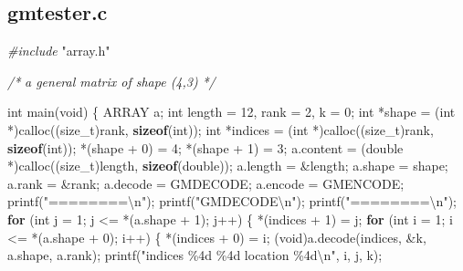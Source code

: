 \documentclass[
  12pt,
]{article}
\newenvironment{Shaded}{\begin{snugshade}}{\end{snugshade}}
\newcommand{\CommentTok}[1]{\textcolor[rgb]{0.56,0.35,0.01}{\textit{#1}}}
\newcommand{\ControlFlowTok}[1]{\textcolor[rgb]{0.13,0.29,0.53}{\textbf{#1}}}
\newcommand{\DataTypeTok}[1]{\textcolor[rgb]{0.13,0.29,0.53}{#1}}
\newcommand{\DecValTok}[1]{\textcolor[rgb]{0.00,0.00,0.81}{#1}}
\newcommand{\ImportTok}[1]{#1}
\newcommand{\KeywordTok}[1]{\textcolor[rgb]{0.13,0.29,0.53}{\textbf{#1}}}
\newcommand{\NormalTok}[1]{#1}
\newcommand{\PreprocessorTok}[1]{\textcolor[rgb]{0.56,0.35,0.01}{\textit{#1}}}
\newcommand{\SpecialCharTok}[1]{\textcolor[rgb]{0.00,0.00,0.00}{#1}}
\newcommand{\StringTok}[1]{\textcolor[rgb]{0.31,0.60,0.02}{#1}}
\begin{document}
\hypertarget{gmtester.c}{%
\subsection{gmtester.c}\label{gmtester.c}}

\begin{Shaded}
\begin{Highlighting}[]
\PreprocessorTok{\#include }\ImportTok{"array.h"}

\CommentTok{/*}
\CommentTok{  a general matrix of shape (4,3)}
\CommentTok{*/}

\DataTypeTok{int}\NormalTok{ main(}\DataTypeTok{void}\NormalTok{) \{}
\NormalTok{  ARRAY a;}
  \DataTypeTok{int}\NormalTok{ length = }\DecValTok{12}\NormalTok{, rank = }\DecValTok{2}\NormalTok{, k = }\DecValTok{0}\NormalTok{;}
  \DataTypeTok{int}\NormalTok{ *shape = (}\DataTypeTok{int}\NormalTok{ *)calloc((}\DataTypeTok{size\_t}\NormalTok{)rank, }\KeywordTok{sizeof}\NormalTok{(}\DataTypeTok{int}\NormalTok{));}
  \DataTypeTok{int}\NormalTok{ *indices = (}\DataTypeTok{int}\NormalTok{ *)calloc((}\DataTypeTok{size\_t}\NormalTok{)rank, }\KeywordTok{sizeof}\NormalTok{(}\DataTypeTok{int}\NormalTok{));}
\NormalTok{  *(shape + }\DecValTok{0}\NormalTok{) = }\DecValTok{4}\NormalTok{;}
\NormalTok{  *(shape + }\DecValTok{1}\NormalTok{) = }\DecValTok{3}\NormalTok{;}
\NormalTok{  a.content = (}\DataTypeTok{double}\NormalTok{ *)calloc((}\DataTypeTok{size\_t}\NormalTok{)length, }\KeywordTok{sizeof}\NormalTok{(}\DataTypeTok{double}\NormalTok{));}
\NormalTok{  a.length = \&length;}
\NormalTok{  a.shape = shape;}
\NormalTok{  a.rank = \&rank;}
\NormalTok{  a.decode = GMDECODE;}
\NormalTok{  a.encode = GMENCODE;}
\NormalTok{  printf(}\StringTok{"========}\SpecialCharTok{\textbackslash{}n}\StringTok{"}\NormalTok{);}
\NormalTok{  printf(}\StringTok{"GMDECODE}\SpecialCharTok{\textbackslash{}n}\StringTok{"}\NormalTok{);}
\NormalTok{  printf(}\StringTok{"========}\SpecialCharTok{\textbackslash{}n}\StringTok{"}\NormalTok{);}
  \ControlFlowTok{for}\NormalTok{ (}\DataTypeTok{int}\NormalTok{ j = }\DecValTok{1}\NormalTok{; j \textless{}= *(a.shape + }\DecValTok{1}\NormalTok{); j++) \{}
\NormalTok{    *(indices + }\DecValTok{1}\NormalTok{) = j;}
    \ControlFlowTok{for}\NormalTok{ (}\DataTypeTok{int}\NormalTok{ i = }\DecValTok{1}\NormalTok{; i \textless{}= *(a.shape + }\DecValTok{0}\NormalTok{); i++) \{}
\NormalTok{      *(indices + }\DecValTok{0}\NormalTok{) = i;}
\NormalTok{      (}\DataTypeTok{void}\NormalTok{)a.decode(indices, \&k, a.shape, a.rank);}
\NormalTok{      printf(}\StringTok{"indices \%4d \%4d location \%4d}\SpecialCharTok{\textbackslash{}n}\StringTok{"}\NormalTok{, i, j, k);}

\end{Highlighting}
\end{Shaded}
\end{document}
